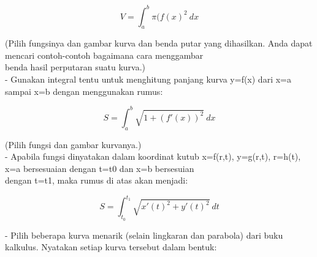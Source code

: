 \documentclass[12pt,arial,letterpaper]{book}
\begin{document}
\begin{eulernootebook}
\begin{eulercomment}
\begin{eulercomment}
\begin{eulernootebook}
\begin{eulercomment}
\begin{eulercomment}
\begin{eulercomment}
\begin{eulercomment}
\begin{eulercomment}
\begin{eulercomment}
\begin{eulernotebook}
\begin{eulercomment}
\begin{eulercomment}
\begin{eulercomment}
\begin{eulercomment}
\begin{eulercomment}
\begin{eulercomment}
\begin{eulercomment}
\begin{eulercomment}
\begin{eulercomment}
\begin{eulercomment}
\begin{eulercomment}
\begin{eulercomment}
\begin{eulercomment}
\begin{eulercomment}
\begin{eulercomment}
\begin{eulercomment}
\begin{eulercomment}
\begin{eulercomment}
\begin{eulercomment}
\begin{eulercomment}
\begin{eulercomment}
\begin{eulercomment}
\begin{eulercomment}
\end{eulercomment}
\begin{eulerformula}
\[
V = \int_a^b \pi (f(x)^2\ dx
\]
\end{eulerformula}
\begin{eulercomment}
(Pilih fungsinya dan gambar kurva dan benda putar yang dihasilkan.
Anda dapat mencari contoh-contoh bagaimana cara menggambar\\
benda hasil perputaran suatu kurva.)\\
- Gunakan integral tentu untuk menghitung panjang kurva y=f(x) dari
x=a sampai x=b dengan menggunakan rumus:

\end{eulercomment}
\begin{eulerformula}
\[
S = \int_a^b \sqrt{1+(f'(x))^2} \ dx
\]
\end{eulerformula}
\begin{eulercomment}
(Pilih fungsi dan gambar kurvanya.)\\
- Apabila fungsi dinyatakan dalam koordinat kutub x=f(r,t), y=g(r,t),
r=h(t), x=a bersesuaian dengan t=t0 dan x=b bersesuian\\
dengan t=t1, maka rumus di atas akan menjadi:

\end{eulercomment}
\begin{eulerformula}
\[
S=\int_{t_0}^{t_1} \sqrt{x'(t)^2+y'(t)^2}\ dt
\]
\end{eulerformula}
\begin{eulercomment}
- Pilih beberapa kurva menarik (selain lingkaran dan parabola) dari
buku  kalkulus. Nyatakan setiap kurva tersebut dalam bentuk:


\end{eulercomment}
\end{eulercomment}
\end{eulercomment}
\end{eulercomment}
\end{eulercomment}
\end{eulercomment}
\end{eulercomment}
\end{eulercomment}
\end{eulercomment}
\end{eulercomment}
\end{eulercomment}
\end{eulercomment}
\end{eulercomment}
\end{eulercomment}
\end{eulercomment}
\end{eulercomment}
\end{eulercomment}
\end{eulercomment}
\end{eulercomment}
\end{eulercomment}
\end{eulercomment}
\end{eulercomment}
\end{eulercomment}
\end{eulernotebook}
\end{eulercomment}
\end{eulercomment}
\end{eulercomment}
\end{eulercomment}
\end{eulercomment}
\end{eulercomment}
\end{eulernootebook}
\end{eulercomment}
\end{eulercomment}
\end{eulernootebook}
\end{document}
